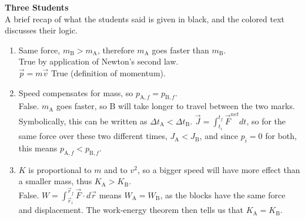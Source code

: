 \documentclass[]{article}
\begin{document}
\begin{TeacherMargin}
\begin{center}
	\large
\end{center}
\textbf{Three Students} \\
A brief recap of what the students said is given in black, and the colored text discusses their logic.
\begin{enumerate}[(1)]
	\item Same force, $m_{\text{B}}>m_{\text{A}}$, therefore $m_{\text{A}}$ goes faster than $m_{\text{B}}$. \\
	{\color{blue}True by application of Newton's second law.} \\
	$\vec{p}=m\vec{v}$ {\color{blue} True (definition of momentum).}
	\item Speed compensates for mass, so $p_{\text{A},f} = p_{\text{B},f}$. \\
	{\color{violet}False. $m_{\text{A}}$ goes faster, so B will take longer to travel between the two marks. Symbolically, this can be written as $\Delta t_{\text{A}} < \Delta t_{\text{B}}$. $\vec{J} = \int_{t_{i}}^{t_{f}}\vec{F}^{net}dt$, so for the same force over these two different times, $J_{\text{A}} < J_{\text{B}}$, and since $p_{i}=0$ for both, this means $p_{\text{A},f} < p_{\text{B},f}$.}
	\item $K$ is proportional to $m$ and to $v^{2}$, so a bigger speed will have more effect than a smaller mass, thus $K_{\text{A}}>K_{\text{B}}$. \\
	{\color{violet} False. $W = \int_{\vec{r}_{i}}^{\vec{r}_{f}}\vec{F}\cdot d\vec{r}$ means $W_{\text{A}} = W_{\text{B}}$, as the blocks have the same force and displacement. The work-energy theorem then tells us that $K_{\text{A}}=K_{\text{B}}$.} \\

\end{enumerate}
\end{TeacherMargin}
\end{document}
